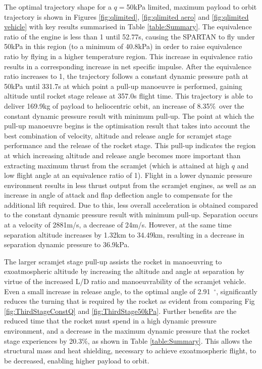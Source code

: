 \documentclass[journal]{new-aiaa}
\newcommand{\PayloadImprovement}{8.35\%}
\newcommand{\qDecrease}{20.3\%}
\newcommand{\PayloadToOrbitFiftykPa}{169.9}
\newcommand{\SeparationAltFiftykPa}{34.49}
\newcommand{\SeparationvFiftykPa}{2881}
\newcommand{\SeparationAngleFiftykPa}{2.91}
\newcommand{\SeparationqFiftykPa}{36.9}
\newcommand{\FlightTimeFiftykPa}{357.0}
\begin{document}
 
The optimal trajectory shape for a $q=$50kPa limited, maximum payload to orbit trajectory is shown in Figures \ref{fig:qlimited}, \ref{fig:qlimited aero} and \ref{fig:qlimited vehicle} with key results summarised in Table \ref{table:Summary}. 
The equivalence ratio of the engine is less than 1 until 52.77s, causing the SPARTAN to fly under 50kPa in this region (to a minimum of 40.8kPa) in order to raise equivalence ratio by flying in a higher temperature region. This increase in equivalence ratio results in a corresponding increase in net specific impulse.
 After the equivalence ratio increases to 1, the trajectory follows a constant dynamic pressure path at 50kPa until 331.7s at which point a pull-up manoeuvre is performed, gaining altitude until rocket stage release at \FlightTimeFiftykPa s flight time. 
 This trajectory is able to deliver \PayloadToOrbitFiftykPa kg of payload to heliocentric orbit, an increase of \PayloadImprovement\ over the constant dynamic pressure result with minimum pull-up. The point at which the pull-up manoeuvre begins is the optimisation result that takes into account the best combination of velocity, altitude and release angle for scramjet stage performance and the release of the rocket stage. This pull-up indicates the region at which increasing altitude and release angle becomes more important than extracting maximum thrust from the scramjet (which is attained at high $q$ and low flight angle at an equivalence ratio of 1).
 Flight in a lower dynamic pressure environment results in less thrust output from the scramjet engines, as well as an increase in angle of attack and flap deflection angle to compensate for the additional lift required. Due to this, less overall acceleration is obtained compared to the constant dynamic pressure result with minimum pull-up. Separation occurs at a velocity of \SeparationvFiftykPa m/s, a decrease of 24m/s. However, at the same time separation altitude increases by 1.32km to \SeparationAltFiftykPa km, resulting in a decrease in separation dynamic pressure to \SeparationqFiftykPa kPa. 

The larger scramjet stage pull-up assists the rocket in manoeuvring to exoatmospheric altitude by increasing the altitude and angle at separation by virtue of the increased L/D ratio and manoeuvrability of the scramjet vehicle. Even a small increase in release angle, to the optimal angle of \SeparationAngleFiftykPa~$^\circ$, significantly reduces the turning that is required by the rocket as evident from comparing Fig \ref{fig:ThirdStageConstQ} and \ref{fig:ThirdStage50kPa}. Further benefits are the reduced time that the rocket must spend in a high dynamic pressure environment, and a decrease in the maximum dynamic pressure that the rocket stage experiences by \qDecrease, as shown in Table \ref{table:Summary}. This allows the structural mass and heat shielding, necessary to achieve exoatmospheric flight, to be decreased, enabling higher payload to orbit. 
\end{document}
